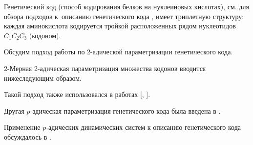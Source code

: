 Генетический код (способ кодирования белков на нуклеиновых кислотах), см. для обзора подходов к~описанию генетического кода \cite{KooninNovozhilov}, имеет триплетную структуру: каждая аминокислота кодируется тройкой расположенных рядом нуклеотидов $C_1C_2C_3$ (кодоном).



Обсудим подход работы \cite{2Adic2Dim} по 2-адической параметризации генетического кода.

2-Мерная 2-адическая параметризация множества кодонов вводится нижеследующим образом. 

Такой подход также использовался в работах [, ]. 

Другая $p$-адическая параметризация генетического кода была введена в \cite{DD}. 

Применение  $p$-адических динамических систем к описанию генетического кода обсуждалось в \cite{Andr}.





